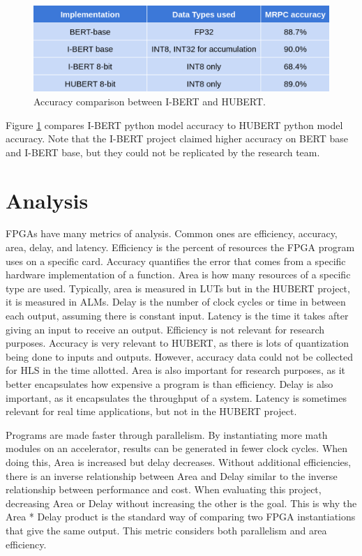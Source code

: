 \documentclass[12pt]{article}
\begin{document}
	\begin{figure}[h!]
		\centering
		\includegraphics[width=\linewidth]{figures/accuracy.png}
		\caption{Accuracy comparison between I-BERT and HUBERT.}
		\label{fig:accuracy}
	\end{figure}

	Figure \ref{fig:accuracy} compares I-BERT python model accuracy to HUBERT python model accuracy. Note that the I-BERT project \cite{ibert} claimed higher accuracy on BERT base and I-BERT base, but they could not be replicated by the research team. 
	
	\section{Analysis}
	FPGAs have many metrics of analysis. Common ones are efficiency, accuracy, area, delay, and latency. Efficiency is the percent of resources the FPGA program uses on a specific card. Accuracy quantifies the error that comes from a specific hardware implementation of a function. Area is how many resources of a specific type are used. Typically, area is measured in LUTs but in the HUBERT project, it is measured in ALMs. Delay is the number of clock cycles or time in between each output, assuming there is constant input. Latency is the time it takes after giving an input to receive an output. Efficiency is not relevant for research purposes. Accuracy is very relevant to HUBERT, as there is lots of quantization being done to inputs and outputs. However, accuracy data could not be collected for HLS in the time allotted. Area is also important for research purposes, as it better encapsulates how expensive a program is than efficiency. Delay is also important, as it encapsulates the throughput of a system. Latency is sometimes relevant for real time applications, but not in the HUBERT project. 
	
	Programs are made faster through parallelism. By instantiating more math modules on an accelerator, results can be generated in fewer clock cycles. When doing this, Area is increased but delay decreases. Without additional efficiencies, there is an inverse relationship between Area and Delay similar to the inverse relationship between performance and cost. When evaluating this project, decreasing Area or Delay without increasing the other is the goal. This is why the Area * Delay product is the standard way of comparing two FPGA instantiations that give the same output. This metric considers both parallelism and area efficiency.
	
\end{document}
